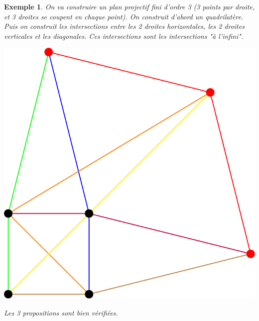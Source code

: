 \documentclass[a4paper]{article}
\newtheorem{Ex}{Exemple}[subsection]
\begin{document}
\begin{Ex}
  On va construire un plan projectif fini d'ordre 3 (3 points par droite, et 3 droites se coupent en chaque point). On construit d'abord un quadrilatère. Puis on construit les intersections entre les 2 droites horizontales, les 2 droites verticales et les diagonales. Ces intersections sont les intersections "à l'infini".
\begin{center}
\includegraphics{test_tikz.pdf}
\end{center}
Les 3 propositions sont bien vérifiées.
\end{Ex}
\end{document}
